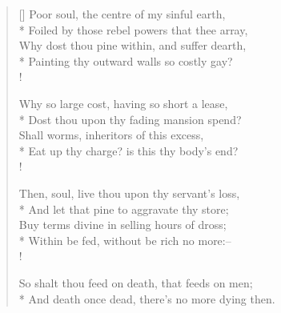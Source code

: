 \documentclass[MAIN]{subfiles}
\begin{document}
\settowidth{\versewidth}{Poor soul, the centre of my sinful earth,}
\begin{verse}[\versewidth]
Poor soul, the centre of my sinful earth,\\*
Foiled by those rebel powers that thee array,\\
Why dost thou pine within, and suffer dearth,\\*
Painting thy outward walls so costly gay?\\!

Why so large cost, having so short a lease,\\*
Dost thou upon thy fading mansion spend?\\
Shall worms, inheritors of this excess,\\*
Eat up thy charge? is this thy body's end?\\!

Then, soul, live thou upon thy servant's loss,\\*
And let that pine to aggravate thy store;\\
Buy terms divine in selling hours of dross;\\*
Within be fed, without be rich no more:--\\!

So shalt thou feed on death, that feeds on men;\\*
And death once dead, there's no more dying then.
\end{verse}
\end{document}
